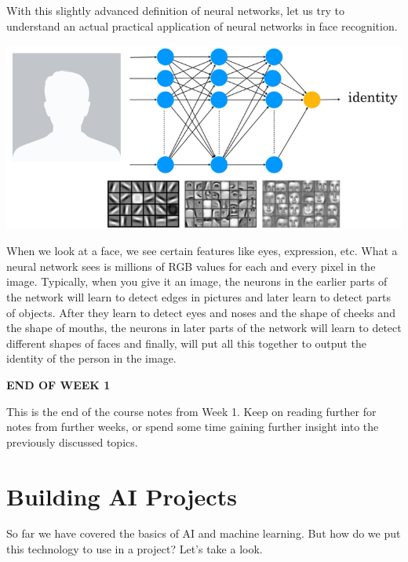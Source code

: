 \documentclass{article}[a4paper,12pt]
\theoremstyle{definition}
\begin{document}
With this slightly advanced definition of neural networks, let us try to understand an actual practical application of neural networks in face recognition. 
\begin{center}\includegraphics{face_recognition.png}\end{center}
When we look at a face, we see certain features like eyes, expression, etc. What a neural network sees is millions of RGB values for each and every pixel in the image. Typically, when you give it an image, the neurons in the earlier parts of the network will learn to detect edges in pictures and later learn to detect parts of objects. After they learn to detect eyes and noses and the shape of cheeks and the shape of mouths, the neurons in later parts of the network will learn to detect different shapes of faces and finally, will put all this together to output the identity of the person in the image.

\hrulefill
\begin{center}\textbf{END OF WEEK 1}\end{center}
This is the end of the course notes from Week 1. Keep on reading further for notes from further weeks, or spend some time gaining further insight into the previously discussed topics.

\hrulefill
\section{Building AI Projects}
So far we have covered the basics of AI and machine learning. But how do we put this technology to use in a project? Let's take a look.
\end{document}

